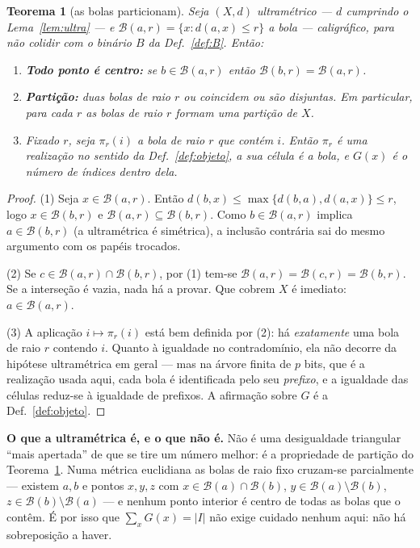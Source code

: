 \documentclass[11pt,a4paper]{article}
\newcommand{\abs}[1]{\lvert #1\rvert}
\newtheorem{teorema}{Teorema}
\begin{document}
\begin{teorema}[as bolas particionam]\label{thm:bolas}
Seja $(X,d)$ ultramétrico --- $d$ cumprindo o Lema~\ref{lem:ultra} --- e
$\mathcal{B}(a,r)=\{x: d(a,x)\le r\}$ a bola --- caligráfico, para não
colidir com o binário $B$ da Def.~\ref{def:B}. Então:
\begin{enumerate}\itemsep3pt
\item[(1)] \textbf{Todo ponto é centro:} se $b\in \mathcal{B}(a,r)$ então $\mathcal{B}(b,r)=\mathcal{B}(a,r)$.
\item[(2)] \textbf{Partição:} duas bolas de raio $r$ ou coincidem ou são
disjuntas. Em particular, para cada $r$ as bolas de raio $r$ formam uma partição
de $X$.
\item[(3)] Fixado $r$, seja $\pi_r(i)$ a bola de raio $r$ que contém $i$. Então
$\pi_r$ é uma realização no sentido da Def.~\ref{def:objeto}, a sua célula
\emph{é} a bola, e $G(x)$ é o número de índices dentro dela.
\end{enumerate}
\end{teorema}

\begin{proof}
(1) Seja $x\in \mathcal{B}(a,r)$. Então $d(b,x)\le\max\{d(b,a),d(a,x)\}\le r$, logo
$x\in \mathcal{B}(b,r)$ e $\mathcal{B}(a,r)\subseteq \mathcal{B}(b,r)$. Como $b\in \mathcal{B}(a,r)$ implica
$a\in \mathcal{B}(b,r)$ (a ultramétrica é simétrica), a inclusão contrária sai do mesmo
argumento com os papéis trocados.

(2) Se $c\in \mathcal{B}(a,r)\cap \mathcal{B}(b,r)$, por (1) tem-se $\mathcal{B}(a,r)=\mathcal{B}(c,r)=\mathcal{B}(b,r)$. Se a
interseção é vazia, nada há a provar. Que cobrem $X$ é imediato:
$a\in \mathcal{B}(a,r)$.

(3) A aplicação $i\mapsto\pi_r(i)$ está bem definida por (2): há
\emph{exatamente} uma bola de raio $r$ contendo $i$. Quanto à igualdade no
contradomínio, ela não decorre da hipótese ultramétrica em geral --- mas na
árvore finita de $p$ bits, que é a realização usada aqui, cada bola é
identificada pelo seu \emph{prefixo}, e a igualdade das células reduz-se à
igualdade de prefixos. A afirmação sobre $G$ é a Def.~\ref{def:objeto}.
\end{proof}

\medskip\noindent\textbf{O que a ultramétrica é, e o que não é.} Não é uma
desigualdade triangular ``mais apertada'' de que se tire um número melhor: é a
propriedade de partição do Teorema~\ref{thm:bolas}. Numa métrica euclidiana as
bolas de raio fixo cruzam-se parcialmente --- existem $a,b$ e pontos $x,y,z$ com
$x\in \mathcal{B}(a)\cap \mathcal{B}(b)$, $y\in \mathcal{B}(a)\setminus \mathcal{B}(b)$, $z\in \mathcal{B}(b)\setminus \mathcal{B}(a)$ --- e
nenhum ponto interior é centro de todas as bolas que o contêm. É por isso que
$\sum_x G(x)=\abs{I}$ não exige cuidado nenhum aqui: não há sobreposição a haver.
\end{document}
